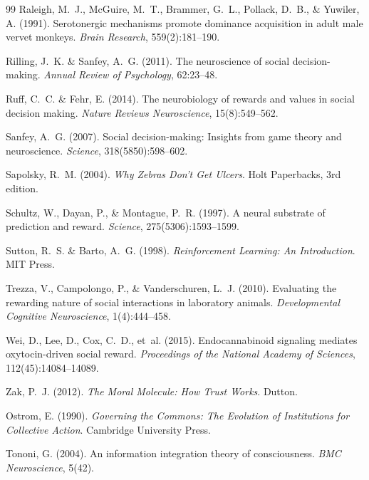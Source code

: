 \documentclass[11pt,a4paper]{article}
\begin{document}
\begin{thebibliography}{99}
Raleigh, M.~J., McGuire, M.~T., Brammer, G.~L., Pollack, D.~B., \& Yuwiler, A. (1991).
\newblock Serotonergic mechanisms promote dominance acquisition in adult male vervet monkeys.
\newblock \emph{Brain Research}, 559(2):181--190.

Rilling, J.~K. \& Sanfey, A.~G. (2011).
\newblock The neuroscience of social decision-making.
\newblock \emph{Annual Review of Psychology}, 62:23--48.

Ruff, C.~C. \& Fehr, E. (2014).
\newblock The neurobiology of rewards and values in social decision making.
\newblock \emph{Nature Reviews Neuroscience}, 15(8):549--562.

Sanfey, A.~G. (2007).
\newblock Social decision-making: Insights from game theory and neuroscience.
\newblock \emph{Science}, 318(5850):598--602.

Sapolsky, R.~M. (2004).
\newblock \emph{Why Zebras Don't Get Ulcers}.
\newblock Holt Paperbacks, 3rd edition.

Schultz, W., Dayan, P., \& Montague, P.~R. (1997).
\newblock A neural substrate of prediction and reward.
\newblock \emph{Science}, 275(5306):1593--1599.

Sutton, R.~S. \& Barto, A.~G. (1998).
\newblock \emph{Reinforcement Learning: An Introduction}.
\newblock MIT Press.

Trezza, V., Campolongo, P., \& Vanderschuren, L.~J. (2010).
\newblock Evaluating the rewarding nature of social interactions in laboratory animals.
\newblock \emph{Developmental Cognitive Neuroscience}, 1(4):444--458.

Wei, D., Lee, D., Cox, C.~D., et~al. (2015).
\newblock Endocannabinoid signaling mediates oxytocin-driven social reward.
\newblock \emph{Proceedings of the National Academy of Sciences}, 112(45):14084--14089.

Zak, P.~J. (2012).
\newblock \emph{The Moral Molecule: How Trust Works}.
\newblock Dutton.

Ostrom, E. (1990).
\newblock \emph{Governing the Commons: The Evolution of Institutions for Collective Action}.
\newblock Cambridge University Press.

Tononi, G. (2004).
\newblock An information integration theory of consciousness.
\newblock \emph{BMC Neuroscience}, 5(42).

\end{thebibliography}
\end{document}
